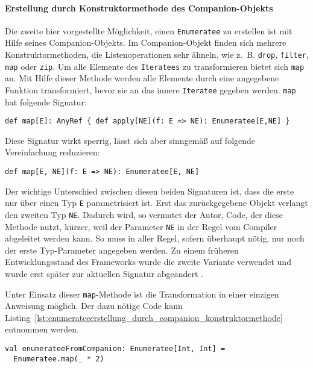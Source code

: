 
\paragraph{Erstellung durch Konstruktormethode des Companion-Objekts} %
\label{par:enumerateeerstellung_durch_konstruktormethode_des_companion_objekts}\mbox{} %

Die zweite hier vorgestellte Möglichkeit, einen \lstinline|Enumeratee| zu erstellen ist mit Hilfe seines Companion-Objekts.
Im Companion-Objekt finden sich mehrere Konstruktormethoden, die Listenoperationen sehr ähneln, wie z.~B. \lstinline|drop|, \lstinline|filter|, \lstinline|map| oder \lstinline|zip|.
Um alle Elemente des \lstinline|Iteratees| zu transformieren bietet sich \lstinline|map| an.
Mit Hilfe dieser Methode werden alle Elemente durch eine angegebene Funktion transformiert, bevor sie an das innere \lstinline|Iteratee| gegeben werden.
\lstinline|map| hat folgende Signatur:
\begin{lstlisting}
def map[E]: AnyRef { def apply[NE](f: E => NE): Enumeratee[E,NE] }
\end{lstlisting}
Diese Signatur wirkt sperrig, lässt sich aber sinngemäß auf folgende Vereinfachung reduzieren:
\begin{lstlisting}
def map[E, NE](f: E => NE): Enumeratee[E, NE]
\end{lstlisting}

Der wichtige Unterschied zwischen diesen beiden Signaturen ist, dass die erste nur über einen Typ \lstinline|E| parametrisiert ist.
Erst das zurückgegebene Objekt verlangt den zweiten Typ \lstinline|NE|.
Dadurch wird, so vermutet der Autor, Code, der diese Methode nutzt, kürzer, weil der Parameter \lstinline|NE| in der Regel vom Compiler abgeleitet werden kann.
So muss in aller Regel, sofern überhaupt nötig, nur noch der erste Typ-Parameter angegeben werden.
Zu einem früheren Entwicklungsstand des Frameworks wurde die zweite Variante verwendet und wurde erst später zur aktuellen Signatur abgeändert \cite[vgl.][]{play_enumeratee_map_signatur}.

Unter Einsatz dieser \lstinline|map|-Methode ist die Transformation in einer einzigen Anweisung möglich.
Der dazu nötige Code kann Listing~\ref{lst:enumerateeerstellung_durch_companion_konstruktormethode} entnommen werden.

\begin{lstlisting}[caption=Erstellung eines Enumeratees durch die map-Konstruktormethode, label=lst:enumerateeerstellung_durch_companion_konstruktormethode]
val enumerateeFromCompanion: Enumeratee[Int, Int] =
  Enumeratee.map(_ * 2)
\end{lstlisting}

